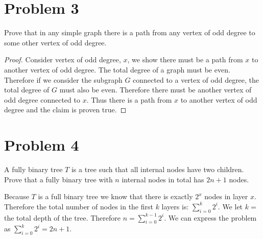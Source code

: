\documentclass[11pt]{article}
\begin{document}

\newpage
\section*{Problem 3}

Prove that in any simple graph there is a path from any vertex of odd degree
to some other vertex of odd degree.
\newline

\begin{proof}

Consider vertex of odd degree, $x$, we show there must be a path from $x$ to another vertex of odd degree. The total degree of a graph must be even. Therefore if we consider the subgraph $G$ connected to a vertex of odd degree, the total degree of $G$ must also be even. Therefore there must be another vertex of odd degree connected to $x$. Thus there is a path from $x$ to another vertex of odd degree and the claim is proven true. 

\end{proof}

\newpage
\section*{Problem 4}

A fully binary tree $T$ is a tree such that all internal nodes have
two children. Prove that a fully binary tree with $n$ internal nodes
in total has $2n+1$ nodes.
\newline

Because $T$ is a full binary tree we know that there is exactly $2^x$ nodes in layer $x$. Therefore the total number of nodes in the first $k$ layers is: $\sum _{i = 0}^{k} 2^i$. We let $k = $ the total depth of the tree. Therefore $n = \sum _{i = 0}^{k-1} 2^i$. We can express the problem as $\sum _{i = 0}^{k} 2^i = 2n + 1$. 
\end{document}
